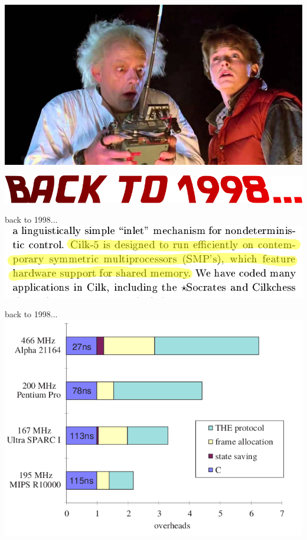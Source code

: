 \documentclass[13pt]{beamer}
\begin{document}
\begin{frame}{}
	\begin{center}
	\includegraphics[width=.9\textwidth]{figs/backtofuture}
    \bigskip

    \includegraphics[width=.9\textwidth]{figs/back}
	\end{center}
\end{frame}

\begin{frame}{back to 1998...}{}
\centering
\includegraphics[width=.9\textwidth]{figs/cilk-smp}
\end{frame}

\begin{frame}{back to 1998...}{}
\centering
\includegraphics[width=.9\textwidth]{figs/cilk-machines}
\end{frame}
\end{document}
